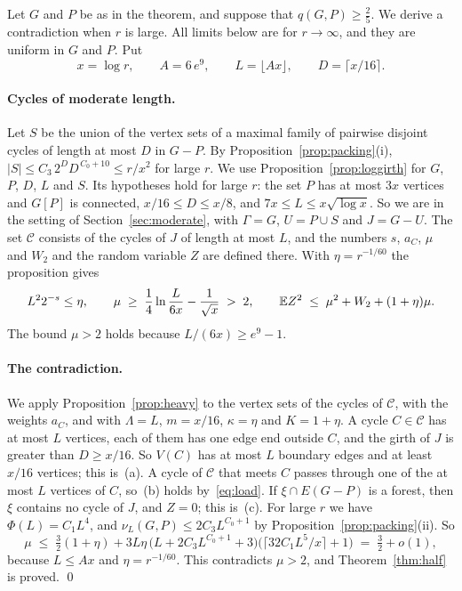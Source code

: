 Let $G$ and $P$ be as in the theorem, and suppose that $q(G,P)\ge\frac25$. We derive a
contradiction when $r$ is large. All limits below are for $r\to\infty$, and they are uniform in
$G$ and $P$. Put
\[
  x=\log r,\qquad A=6\,e^{9},\qquad L=\lfloor Ax\rfloor,\qquad D=\lceil x/16\rceil .
\]

\paragraph{Cycles of moderate length.}
Let $S$ be the union of the vertex sets of a maximal family of pairwise disjoint cycles of length
at most $D$ in $G-P$. By Proposition~\ref{prop:packing}(i),
$|S|\le C_3\,2^{D}D^{\,C_0+10}\le r/x^{2}$ for large $r$. We use
Proposition~\ref{prop:loggirth} for $G$, $P$, $D$, $L$ and $S$. Its hypotheses hold for large
$r$: the set $P$ has at most $3x$ vertices and $G[P]$ is connected, $x/16\le D\le x/8$, and
$7x\le L\le x\sqrt{\log x}$. So we are in the setting of Section~\ref{sec:moderate}, with
$\Gamma=G$, $U=P\cup S$ and $J=G-U$. The set $\mathcal C$ consists of the cycles of $J$ of length
at most $L$, and the numbers $s$, $a_C$, $\mu$ and $W_2$ and the random variable $Z$ are defined
there. With $\eta=r^{-1/60}$ the proposition gives
\[
  L^{2}2^{-s}\le\eta,\qquad \mu\;\ge\;\frac14\ln\frac{L}{6x}-\frac1{\sqrt x}\;>\;2,\qquad
  \mathbb{E} Z^{2}\;\le\;\mu^{2}+W_2+(1+\eta)\mu .
\]
The bound $\mu>2$ holds because $L/(6x)\ge e^{9}-1$.

\paragraph{The contradiction.}
We apply Proposition~\ref{prop:heavy} to the vertex sets of the cycles of $\mathcal C$, with the
weights $a_C$, and with $\Lambda=L$, $m=x/16$, $\kappa=\eta$ and $K=1+\eta$. A cycle
$C\in\mathcal C$ has at most $L$ vertices, each of them has one edge end outside $C$, and the
girth of $J$ is greater than $D\ge x/16$. So $V(C)$ has at most $L$ boundary edges and at least
$x/16$ vertices; this is~(a). A cycle of $\mathcal C$ that meets $C$ passes through one of the
at most $L$ vertices of $C$, so~(b) holds by~\eqref{eq:load}. If $\xi\cap E(G-P)$ is a forest,
then $\xi$ contains no cycle of $J$, and $Z=0$; this is~(c). For large $r$ we have
$\Phi(L)=C_1L^{4}$, and $\nu_L(G,P)\le2C_3L^{C_0+1}$ by Proposition~\ref{prop:packing}(ii). So
\[
  \mu\;\le\;\tfrac32(1+\eta)+3L\eta\,\bigl(L+2C_3L^{C_0+1}+3\bigr)
  \bigl(\lceil32C_1L^{5}/x\rceil+1\bigr)\;=\;\tfrac32+o(1),
\]
because $L\le Ax$ and $\eta=r^{-1/60}$. This contradicts $\mu>2$, and
Theorem~\ref{thm:half} is proved. \qed
